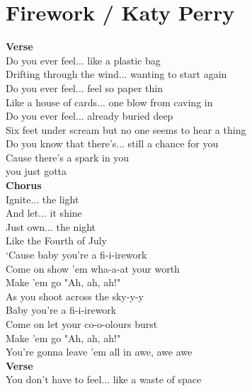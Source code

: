 \section{Firework / Katy Perry}\label{ch:firework}
\Amajor
\Bminor
\FsharpMinor
\DmajorEasy
\EmajorEasy


\textbf{Verse}\\
 Do you ever feel...  like a plastic bag\\
 Drifting through the wind...  wanting to start again\\
 Do you ever feel... feel so paper thin\\
 Like a house of cards...  one blow from caving in\\
 Do you ever feel...  already buried deep\\
 Six feet under scream but no one seems to hear a thing\\
 Do you know that there's... still a chance for you\\
 Cause there's a spark in you\\
 you just gotta\\
\textbf{Chorus}\\
Ignite... the light\\
And let... it shine\\
Just own... the night\\
Like the Fourth of July\\
‘Cause baby you're a fi-i-irework\\
Come on show 'em wha-a-at your worth\\
Make 'em go "Ah, ah, ah!"\\
As you shoot across the sky-y-y\\
Baby you're a fi-i-irework\\
Come on let your co-o-olours burst\\
Make 'em go "Ah, ah, ah!"\\
You're gonna leave 'em all in awe, awe awe\\
\textbf{Verse}\\
 You don't have to feel... like a waste of space\\
